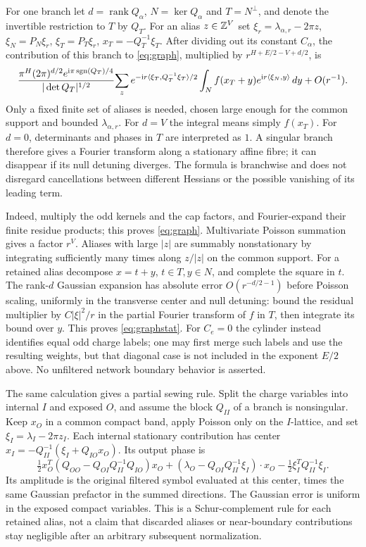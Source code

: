 For one branch let \(d=\operatorname{rank}Q_\alpha\), \(N=\ker Q_\alpha\) and \(T=N^\perp\), and denote the invertible restriction to \(T\) by \(Q_T\). For an alias \(z\in\mathbb Z^V\) set \(\xi_r=\lambda_{\alpha,r}-2\pi z\), \(\xi_N=P_N\xi_r\), \(\xi_T=P_T\xi_r\), \(x_T=-Q_T^{-1}\xi_T\). After dividing out its constant \(C_\alpha\), the contribution of this branch to \eqref{eq:graph}, multiplied by \(r^{H+E/2-V+d/2}\), is
\begin{equation}\label{eq:graphstat}
 \frac{\pi^H(2\pi)^{d/2}e^{{\rm i}\pi\operatorname{sgn}(Q_T)/4}}{|\det Q_T|^{1/2}}\!
 \sum_z e^{-{\rm i} r\langle \xi_T,Q_T^{-1}\xi_T\rangle/2}
       \int_{N} f(x_T+y)e^{{\rm i} r\langle \xi_N,y\rangle}\,dy
       +O(r^{-1}) .
\end{equation}
Only a fixed finite set of aliases is needed, chosen large enough for the common support and bounded \(\lambda_{\alpha,r}\). For \(d=V\) the integral means simply \(f(x_T)\). For \(d=0\), determinants and phases in \(T\) are interpreted as \(1\). A singular branch therefore gives a Fourier transform along a stationary affine fibre; it can disappear if its null detuning diverges. The formula is branchwise and does not disregard cancellations between different Hessians or the possible vanishing of its leading term.

Indeed, multiply the odd kernels and the cap factors, and Fourier-expand their finite residue products; this proves \eqref{eq:graph}. Multivariate Poisson summation gives a factor \(r^V\). Aliases with large \(|z|\) are summably nonstationary by integrating sufficiently many times along \(z/|z|\) on the common support. For a retained alias decompose \(x=t+y\), \(t\in T,y\in N\), and complete the square in \(t\). The rank-\(d\) Gaussian expansion has absolute error \(O(r^{-d/2-1})\) before Poisson scaling, uniformly in the transverse center and null detuning: bound the residual multiplier by \(C|\xi|^2/r\) in the partial Fourier transform of \(f\) in \(T\), then integrate its bound over \(y\). This proves \eqref{eq:graphstat}. For \(C_e=0\) the cylinder instead identifies equal odd charge labels; one may first merge such labels and use the resulting weights, but that diagonal case is not included in the exponent \(E/2\) above. No unfiltered network boundary behavior is asserted.


The same calculation gives a partial sewing rule. Split the charge variables into internal \(I\) and exposed \(O\), and assume the block \(Q_{II}\) of a branch is nonsingular. Keep \(x_O\) in a common compact band, apply Poisson only on the \(I\)-lattice, and set \(\xi_I=\lambda_I-2\pi z_I\). Each internal stationary contribution has center \(x_I=-Q_{II}^{-1}(\xi_I+Q_{IO}x_O)\). Its output phase is
\[
 \tfrac12 x_O^T(Q_{OO}-Q_{OI}Q_{II}^{-1}Q_{IO})x_O
 +(\lambda_O-Q_{OI}Q_{II}^{-1}\xi_I)\cdot x_O
 -\tfrac12\xi_I^T Q_{II}^{-1}\xi_I .
\]
Its amplitude is the original filtered symbol evaluated at this center, times the same Gaussian prefactor in the summed directions. The Gaussian error is uniform in the exposed compact variables. This is a Schur-complement rule for each retained alias, not a claim that discarded aliases or near-boundary contributions stay negligible after an arbitrary subsequent normalization.
